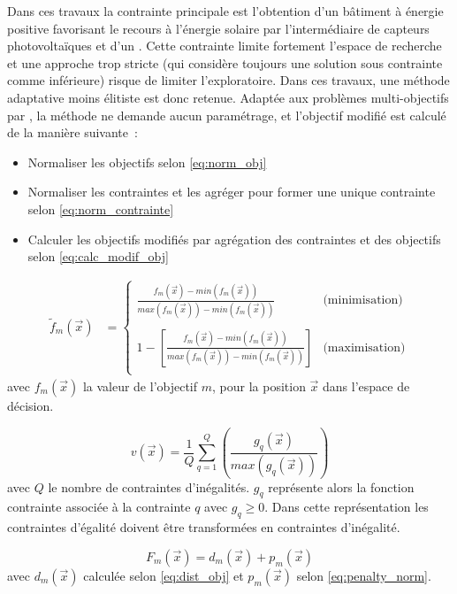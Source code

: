 Dans ces travaux la contrainte principale est l’obtention d’un bâtiment à énergie positive
favorisant le recours à l’énergie solaire par l’intermédiaire de capteurs photovoltaïques
et d’un . Cette contrainte limite fortement l’espace de recherche et une approche
trop stricte (qui considère toujours une solution sous contrainte comme inférieure) risque
de limiter l’exploratoire.
Dans ces travaux, une méthode adaptative moins élitiste est donc retenue. Adaptée
aux problèmes multi-objectifs par \textcite{Woldesenbet20073077}, la méthode ne demande
aucun paramétrage, et l’objectif modifié est calculé de la manière suivante~:
\begin{itemize}
  \item Normaliser les objectifs selon \eqref{eq:norm_obj}
  \item Normaliser les contraintes et les agréger pour former une unique contrainte selon \eqref{eq:norm_contrainte}
  \item Calculer les objectifs modifiés par agrégation des contraintes et des objectifs selon \eqref{eq:calc_modif_obj}
\end{itemize}

\begin{align}\label{eq:norm_obj}
  \tilde{f}_{m}(\vec{x}) &= \begin{cases}
    \frac{f_{m}(\vec{x}) - min(f_{m}(\vec{x}))}{max(f_{m}(\vec{x})) - min(f_{m}(\vec{x}))}
    & \text{(minimisation)} \\ \\ 1 - \left[\frac{f_{m}(\vec{x}) -
    min(f_{m}(\vec{x}))}{max(f_{m}(\vec{x})) - min(f_{m}(\vec{x}))}\right] &
    \text{(maximisation)} \\
  \end{cases}
\end{align}
avec $f_{m}(\vec{x})$ la valeur de l’objectif $m$, pour la position $\vec{x}$ dans l’espace de décision.

\begin{equation}\label{eq:norm_contrainte}
  v(\vec{x}) = \frac{1}{Q} \sum_{q=1}^{Q} \left(\frac{g_{q}(\vec{x})}{max(g_{q}(\vec{x}))}\right)
\end{equation}
avec $Q$ le nombre de contraintes d’inégalités. $g_{q}$ représente alors la fonction contrainte
associée à la contrainte $q$ avec $g_{q} \geq 0$. Dans cette représentation les contraintes
d’égalité doivent être transformées en contraintes d’inégalité.

\begin{equation}\label{eq:calc_modif_obj}
  F_{m}(\vec{x}) = d_{m}(\vec{x}) + p_{m}(\vec{x})
\end{equation}
avec $d_{m}(\vec{x})$ calculée selon \eqref{eq:dist_obj} et $ p_{m}(\vec{x})$ selon \eqref{eq:penalty_norm}.


